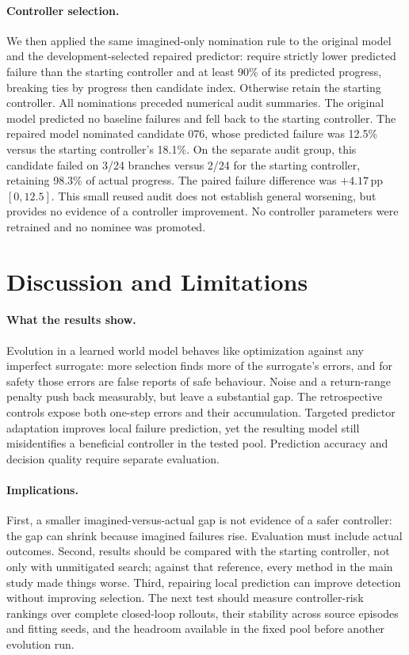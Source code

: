 \documentclass[sigconf,dvipsnames]{acmart}
\newcommand{\pp}{\,pp}
\begin{document}
\paragraph{Controller selection.}
We then applied the same imagined-only nomination rule to the original model
and the development-selected repaired predictor: require strictly lower
predicted failure than the starting controller and at least 90\% of its
predicted progress, breaking ties by progress then candidate index. Otherwise
retain the starting controller. All nominations preceded numerical audit
summaries. The original model predicted no baseline failures and fell back to
the starting controller. The repaired model nominated candidate 076, whose
predicted failure was 12.5\% versus the starting controller's 18.1\%.
On the separate audit group, this candidate failed on 3/24 branches versus
2/24 for the starting controller, retaining 98.3\% of actual progress. The
paired failure difference was $+4.17$\pp{} $[0,12.5]$. This small reused audit
does not establish general worsening, but provides no evidence of a controller
improvement. No controller parameters were retrained and no nominee was promoted.

\section{Discussion and Limitations}
\label{sec:discussion}

\paragraph{What the results show.}
Evolution in a learned world model behaves like optimization against any
imperfect surrogate: more selection finds more of the surrogate's errors, and for
safety those errors are false reports of safe behaviour. Noise and a return-range
penalty push back measurably, but leave a substantial gap. The retrospective
controls expose both one-step errors and their accumulation. Targeted predictor
adaptation improves local failure prediction, yet the resulting model still
misidentifies a beneficial controller in the tested pool. Prediction accuracy
and decision quality require separate evaluation.

\paragraph{Implications.}
First, a smaller imagined-versus-actual gap is not evidence of a safer
controller: the gap can shrink because imagined failures rise. Evaluation must
include actual outcomes. Second, results should be compared with the starting
controller, not only with unmitigated search; against that reference, every
method in the main study made things worse. Third, repairing local prediction
can improve detection without improving selection. The next test should measure
controller-risk rankings over complete closed-loop rollouts, their stability
across source episodes and fitting seeds, and the headroom available in the
fixed pool before another evolution run.
\end{document}
